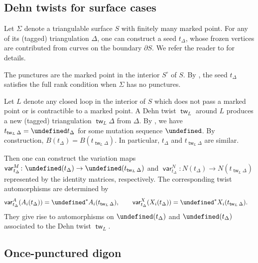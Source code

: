 \documentclass[10pt,a4paper]{amsart}
\renewcommand{\tilde}[1]{\widetilde{#1}}
\newcommand{\opname}[1]{\operatorname{\mathsf{#1}}}
\newcommand{\tw}{{\tilde{w}}}
\newcommand{\var}{\opname{var}}
\let\Mc\undefined
\let\upClAlg\undefined
\let\XClAlg\undefined
\let\seq\undefined
\renewcommand{\tw}{\opname{tw}}
\newcommand{\Mc}{M^\circ}
\newcommand{\upClAlg}{\mathcal{U}^A}
\newcommand{\XClAlg}{\mathcal{U}^X}
\newcommand{\seq}{\boldsymbol{\mu}}%
\renewcommand{\tw}{\opname{tw}}
\numberwithin{equation}{section}
\begin{document}
\subsection{Dehn twists for surface cases}

Let $\Sigma$ denote a triangulable surface $S$ with finitely many
marked point. For any of its (tagged) triangulation $\Delta$, one
can construct a seed $t_{\Delta}$, whose frozen vertices are contributed
from curves on the boundary $\partial S$. We refer the reader to
\cite{FominShapiroThurston08,Muller12} for details.

The punctures are the marked point in the interior $S^{\circ}$ of
$S$. By \cite{Muller12}, the seed $t_{\Delta}$ satisfies the full
rank condition when $\Sigma$ has no punctures.

Let $L$ denote any closed loop in the interior of $S$ which does
not pass a marked point or is contractible to a marked point. A Dehn
twist $\tw_{L}$ around $L$ produces a new (tagged) triangulation
$\tw_{L}\Delta$ from $\Delta$. By \cite{FominShapiroThurston08},
we have $t_{\tw_{L}\Delta}=\seq t_{\Delta}$ for some mutation sequence
$\seq$. By construction, $B(t_{\Delta})=B(t_{\tw_{L}\Delta})$. In
particular, $t_{\Delta}$ and $t_{\tw_{L}\Delta}$ are similar.

Then one can construct the variation maps $\var_{t_{\Delta}}^{M}\colon\Mc(t_{\Delta})\rightarrow\Mc(t_{\tw_{L}\Delta})$
and $\var_{t_{\Delta}}^{N}\colon N(t_{\Delta})\rightarrow N(t_{\tw_{L}\Delta})$
represented by the identity matrices, respectively. The corresponding
twist automorphisms are determined by
\begin{align*}
\var_{t_{\Delta}}^{A}(A_{i}(t_{\Delta})) & =\seq^{*}A_{i}(t_{\tw_{L}\Delta}),\qquad
\var_{t_{\Delta}}^{X}(X_{i}(t_{\Delta})) =\seq^{*}X_{i}(t_{\tw_{L}\Delta}).
\end{align*}
They give rise to automorphisms on $\upClAlg(t_{\Delta})$ and $\XClAlg(t_{\Delta})$
associated to the Dehn twist $\tw_{L}$.

\subsection{Once-punctured digon}
\end{document}
